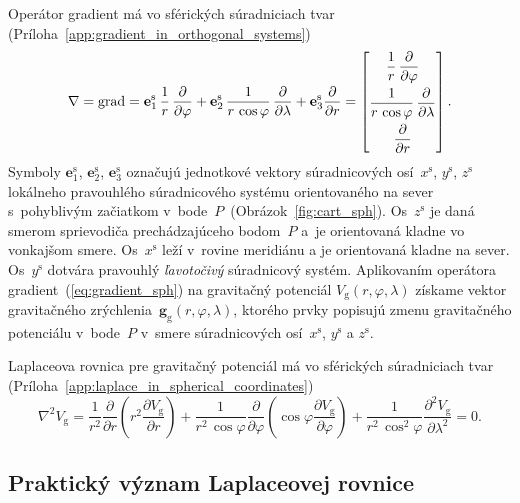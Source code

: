 \documentclass[a4paper,12pt]{book}
\newcommand{\grad}{\mathrm{grad}}
\newcommand{\gidx}{\mathrm g}
\let\vec\mathbf
\begin{document}
Operátor gradient má vo sférických súradniciach tvar 
(Príloha~\ref{app:gradient_in_orthogonal_systems})
%
\begin{equation}
\label{eq:gradient_sph}
\nabla = \grad = \vec e_1^\mathrm{s} \, \frac{1}{r} \, \frac{\partial}{\partial 
\varphi} + \vec e_2^\mathrm{s} \, \frac{1}{r \, \cos\varphi} \, 
\frac{\partial}{\partial \lambda} + \vec e_3^\mathrm{s} 
\frac{\partial}{\partial r}\\
%
=
%
\begin{bmatrix}
\dfrac{1}{r} \, \dfrac{\partial}{\partial \varphi} \\[2ex]
\dfrac{1}{r \, \cos\varphi} \, \dfrac{\partial}{\partial \lambda}\\[2ex]
\dfrac{\partial}{\partial r}
\end{bmatrix}
{.}
\end{equation}
%
Symboly $\vec{e}_1^\mathrm{s}$, $\vec{e}_2^{\mathrm{s}}$, 
$\vec{e}_3^\mathrm{s}$ označujú jednotkové vektory súradnicových 
osí~$x^\mathrm{s}$, $y^\mathrm{s}$, $z^\mathrm{s}$ lokálneho pravouhlého 
súradnicového systému orientovaného na sever s~pohyblivým začiatkom 
v~bode~$P$~(Obrázok~\ref{fig:cart_sph}).  Os~$z^\mathrm{s}$ je daná smerom 
sprievodiča prechádzajúceho bodom~$P$ a~je orientovaná kladne vo vonkajšom 
smere.  Os~$x^\mathrm{s}$ leží v~rovine meridiánu a je orientovaná kladne na 
sever.  Os~$y^\mathrm{s}$ dotvára pravouhlý \emph{ľavotočivý} súradnicový 
systém.  Aplikovaním operátora gradient~(\ref{eq:gradient_sph}) na gravitačný 
potenciál $V_\gidx(r, \varphi, \lambda)$ získame vektor gravitačného 
zrýchlenia~$\vec g_\gidx(r, \varphi, \lambda)$, ktorého prvky popisujú zmenu 
gravitačného potenciálu v~bode~$P$ v~smere súradnicových osí~$x^\mathrm{s}$, 
$y^\mathrm{s}$ a $z^\mathrm{s}$.

Laplaceova rovnica pre gravitačný potenciál má vo sférických súradniciach tvar 
(Príloha~\ref{app:laplace_in_spherical_coordinates})
%
\begin{equation}
\label{eq:vg_laplace_sph}
\nabla^2 V_\gidx = \frac{1}{r^2} \frac{\partial}{\partial r} \left( r^2
\frac{\partial V_\gidx}{\partial r} \right) + \frac{1}{r^2 \, \cos\varphi}
\frac{\partial}{\partial \varphi} \left( \cos\varphi \frac{\partial
V_\gidx}{\partial \varphi} \right) + \frac{1}{r^2 \,
\cos^2\varphi}\frac{\partial^2 V_\gidx}{\partial \lambda^2} = 0{.}
\end{equation}


\subsection{Praktický význam Laplaceovej rovnice}
\label{sec:meaning_of_laplace_equation_in_practice}
\end{document}

